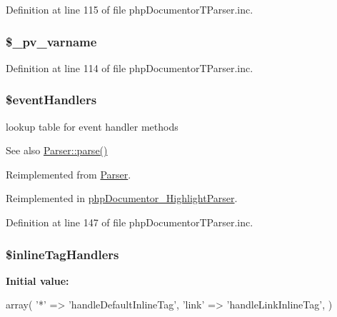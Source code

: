 \-Definition at line 115 of file php\-Documentor\-T\-Parser.\-inc.

\hypertarget{classphp_documentor_t_parser_a17819733e12073fc86ff7a587faca0fd}{
\subsubsection[{\$\-\_\-pv\-\_\-varname}]{\setlength{\rightskip}{0pt plus 5cm}\$\-\_\-pv\-\_\-varname}}\label{classphp_documentor_t_parser_a17819733e12073fc86ff7a587faca0fd}


\-Definition at line 114 of file php\-Documentor\-T\-Parser.\-inc.

\hypertarget{classphp_documentor_t_parser_a430675102684e9ab820c7622678832b0}{
\subsubsection[{\$event\-Handlers}]{\setlength{\rightskip}{0pt plus 5cm}\$event\-Handlers}}\label{classphp_documentor_t_parser_a430675102684e9ab820c7622678832b0}
lookup table for event handler methods \begin{DoxySeeAlso}{\-See also}
\hyperlink{class_parser_a20139dbf0050f44b70e34bf32d89d7e4}{\-Parser\-::parse()} 
\end{DoxySeeAlso}


\-Reimplemented from \hyperlink{class_parser_a430675102684e9ab820c7622678832b0}{\-Parser}.



\-Reimplemented in \hyperlink{classphp_documentor___highlight_parser_a430675102684e9ab820c7622678832b0}{php\-Documentor\-\_\-\-Highlight\-Parser}.



\-Definition at line 147 of file php\-Documentor\-T\-Parser.\-inc.

\hypertarget{classphp_documentor_t_parser_a429149c3b8b810300374079d8718ce71}{
\subsubsection[{\$inline\-Tag\-Handlers}]{\setlength{\rightskip}{0pt plus 5cm}\$inline\-Tag\-Handlers}}\label{classphp_documentor_t_parser_a429149c3b8b810300374079d8718ce71}
{\bfseries \-Initial value\-:}
\begin{DoxyCode}
 array(
        '*'    => 'handleDefaultInlineTag',
        'link' => 'handleLinkInlineTag',
    )
\end{DoxyCode}


